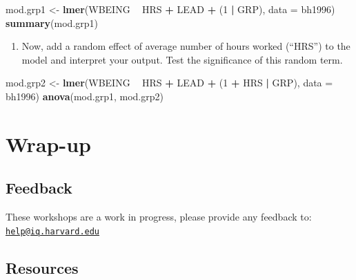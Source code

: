 \documentclass[]{book}
\newenvironment{Shaded}{\begin{snugshade}}{\end{snugshade}}
\newcommand{\KeywordTok}[1]{\textcolor[rgb]{0.13,0.29,0.53}{\textbf{#1}}}
\newcommand{\DataTypeTok}[1]{\textcolor[rgb]{0.13,0.29,0.53}{#1}}
\newcommand{\DecValTok}[1]{\textcolor[rgb]{0.00,0.00,0.81}{#1}}
\newcommand{\StringTok}[1]{\textcolor[rgb]{0.31,0.60,0.02}{#1}}
\newcommand{\OperatorTok}[1]{\textcolor[rgb]{0.81,0.36,0.00}{\textbf{#1}}}
\newcommand{\NormalTok}[1]{#1}
\providecommand{\tightlist}{%
  \setlength{\itemsep}{0pt}\setlength{\parskip}{0pt}}
\begin{document}
\begin{Shaded}
\begin{Highlighting}[]
\NormalTok{  mod.grp1 <-}\StringTok{ }\KeywordTok{lmer}\NormalTok{(WBEING }\OperatorTok{~}\StringTok{ }\NormalTok{HRS }\OperatorTok{+}\StringTok{ }\NormalTok{LEAD }\OperatorTok{+}\StringTok{ }\NormalTok{(}\DecValTok{1} \OperatorTok{|}\StringTok{ }\NormalTok{GRP), }\DataTypeTok{data =}\NormalTok{ bh1996)}
  \KeywordTok{summary}\NormalTok{(mod.grp1)}
\end{Highlighting}
\end{Shaded}

\begin{enumerate}
\def\labelenumi{\arabic{enumi}.}
\setcounter{enumi}{2}
\tightlist
\item
  Now, add a random effect of average number of hours worked (``HRS'')
  to the model and interpret your output. Test the significance of this
  random term.
\end{enumerate}

\begin{Shaded}
\begin{Highlighting}[]
\NormalTok{  mod.grp2 <-}\StringTok{ }\KeywordTok{lmer}\NormalTok{(WBEING }\OperatorTok{~}\StringTok{ }\NormalTok{HRS }\OperatorTok{+}\StringTok{ }\NormalTok{LEAD }\OperatorTok{+}\StringTok{ }\NormalTok{(}\DecValTok{1} \OperatorTok{+}\StringTok{ }\NormalTok{HRS }\OperatorTok{|}\StringTok{ }\NormalTok{GRP), }\DataTypeTok{data =}\NormalTok{ bh1996)}
  \KeywordTok{anova}\NormalTok{(mod.grp1, mod.grp2)}
\end{Highlighting}
\end{Shaded}

\section{Wrap-up}\label{wrap-up-1}

\subsection{Feedback}\label{feedback-1}

These workshops are a work in progress, please provide any feedback to:
\href{mailto:help@iq.harvard.edu}{\nolinkurl{help@iq.harvard.edu}}

\subsection{Resources}\label{resources-1}
\end{document}
